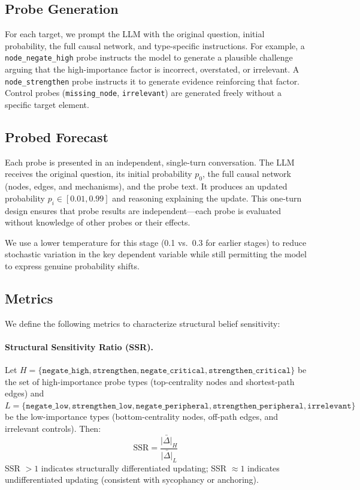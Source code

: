 \documentclass[11pt]{article}
\begin{document}
\subsection{Probe Generation}
\label{sec:probes}

For each target, we prompt the LLM with the original question, initial probability, the full causal network, and type-specific instructions. For example, a \texttt{node\_negate\_high} probe instructs the model to generate a plausible challenge arguing that the high-importance factor is incorrect, overstated, or irrelevant. A \texttt{node\_strengthen} probe instructs it to generate evidence reinforcing that factor. Control probes (\texttt{missing\_node}, \texttt{irrelevant}) are generated freely without a specific target element.

\subsection{Probed Forecast}
\label{sec:probed}

Each probe is presented in an independent, single-turn conversation. The LLM receives the original question, its initial probability $p_0$, the full causal network (nodes, edges, and mechanisms), and the probe text. It produces an updated probability $p_i \in [0.01, 0.99]$ and reasoning explaining the update. This one-turn design ensures that probe results are independent---each probe is evaluated without knowledge of other probes or their effects.

We use a lower temperature for this stage (0.1 vs.\ 0.3 for earlier stages) to reduce stochastic variation in the key dependent variable while still permitting the model to express genuine probability shifts.

\subsection{Metrics}
\label{sec:metrics}

We define the following metrics to characterize structural belief sensitivity:

\paragraph{Structural Sensitivity Ratio (SSR).}
Let $H = \{\texttt{negate\_high}, \texttt{strengthen}, \texttt{negate\_critical}, \texttt{strengthen\_critical}\}$ be the set of high-importance probe types (top-centrality nodes and shortest-path edges) and $L = \{\texttt{negate\_low}, \texttt{strengthen\_low}, \texttt{negate\_peripheral}, \texttt{strengthen\_peripheral}, \texttt{irrelevant}\}$ be the low-importance types (bottom-centrality nodes, off-path edges, and irrelevant controls). Then:
\begin{equation}
    \text{SSR} = \frac{\bar{|\Delta|}_H}{\bar{|\Delta|}_L}
\end{equation}
SSR $> 1$ indicates structurally differentiated updating; SSR $\approx 1$ indicates undifferentiated updating (consistent with sycophancy or anchoring).
\end{document}

